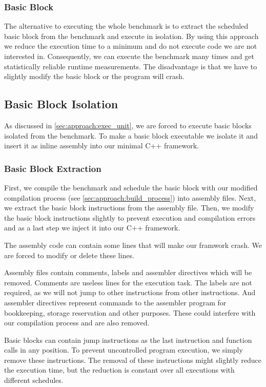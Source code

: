 \subsubsection{Basic Block}
The alternative to executing the whole benchmark is to extract the scheduled basic block from the benchmark and execute in isolation.
By using this approach we reduce the execution time to a minimum and do not execute code we are not interested in.
Consequently, we can execute the benchmark many times and get statistically reliable runtime measurements.
The disadvantage is that we have to slightly modify the basic block or the program will crash.

\subsection{Basic Block Isolation}
As discussed in \cref{sec:approach:exec_unit}, we are forced to execute basic blocks isolated from the benchmark.
To make a basic block executable we isolate it and insert it as inline assembly into our minimal C++ framework.

\subsubsection{Basic Block Extraction}
First, we compile the benchmark and schedule the basic block with our modified compilation process (see \cref{sec:approach:build_process}) into assembly files.
Next, we extract the basic block instructions from the assembly file.
Then, we modify the basic block instructions slightly to prevent execution and compilation errors and as a last step we inject it into our C++ framework.

The assembly code can contain some lines that will make our framwork crash.
We are forced to modify or delete these lines.

Assembly files contain comments, labels and assembler directives which will be removed.
Comments are useless lines for the execution task. 
The labels are not required, as we will not jump to other instructions from other instructions.
And assembler directives represent commands to the assembler program for bookkeeping, storage reservation and other purposes.
These could interfere with our compilation process and are also removed.

Basic blocks can contain jump instructions as the last instruction and function calls in any position.
To prevent uncontrolled program execution, we simply remove these instructions.
The removal of these instructions might slightly reduce the execution time, but the reduction is constant over all executions with different schedules.

